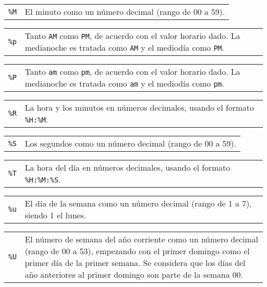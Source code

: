 \documentclass[11pt,spanish]{report}
\begin{document}
\begin{tabular}{@{}p{20pt}p{421.5pt}@{}}
{\tt\%M}&El minuto como un número decimal (rango de 00 a 59).\\
\end{tabular}

\begin{tabular}{@{}p{20pt}p{421.5pt}@{}}
{\tt\%p}&Tanto {\tt AM} como {\tt PM}, de acuerdo con el valor horario dado. La medianoche es tratada como {\tt AM} y el mediodía como {\tt PM}.\\
\end{tabular}

\begin{tabular}{@{}p{20pt}p{421.5pt}@{}}
{\tt\%P}&Tanto {\tt am} como {\tt pm}, de acuerdo con el valor horario dado. La medianoche es tratada como {\tt am} y el mediodía como {\tt pm}.\\
\end{tabular}

\begin{tabular}{@{}p{20pt}p{421.5pt}@{}}
{\tt\%R}&La hora y los minutos en números decimales, usando el formato \verb|%H:%M|.\\
\end{tabular}

\begin{tabular}{@{}p{20pt}p{421.5pt}@{}}
{\tt\%S}&Los segundos como un número decimal (rango de 00 a 59).\\
\end{tabular}

\begin{tabular}{@{}p{20pt}p{421.5pt}@{}}
{\tt\%T}&La hora del día en números decimales, usando el formato \verb|%H:%M:%S|.\\
\end{tabular}

\begin{tabular}{@{}p{20pt}p{421.5pt}@{}}
{\tt\%u}&El día de la semana como un número decimal (rango de 1 a 7), siendo 1 el lunes.\\
\end{tabular}

\begin{tabular}{@{}p{20pt}p{421.5pt}@{}}
{\tt\%U}&El número de semana del año corriente como un número decimal (rango de 00 a 53), empezando con el primer domingo como el primer día de la primer semana. Se considera que los días del año anteriores al primer domingo son parte de la semana 00.\\
\end{tabular}
\end{document}
